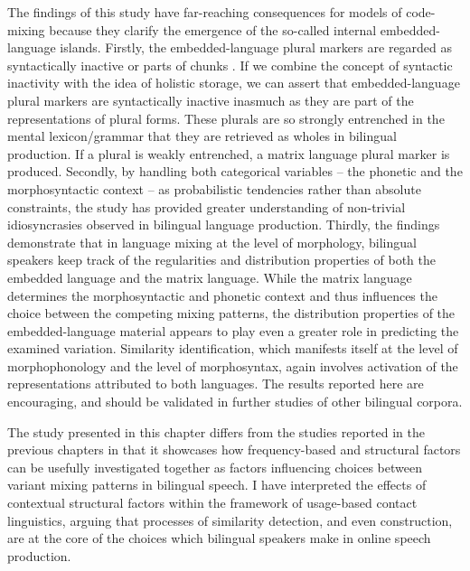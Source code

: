 The findings of this study have far-reaching consequences for models of code-mixing because they clarify the emergence of the so-called internal embedded-language islands. Firstly, the embedded-language plural markers are regarded as syntactically inactive \citep[92]{myers-scotton-contact-2002} or parts of chunks \citep[98]{backus-evidence-1999}. If we combine the concept of syntactic inactivity with the idea of holistic storage, we can assert that embedded-language plural markers are syntactically inactive inasmuch as they are part of the representations of plural forms. These plurals are so strongly entrenched in the mental lexicon/grammar that they are retrieved as wholes in bilingual production. If a plural is weakly entrenched, a matrix language plural marker is produced. Secondly, by handling both categorical variables -- the phonetic and the morphosyntactic context -- as probabilistic tendencies rather than absolute constraints, the study has provided greater understanding of non-trivial idiosyncrasies observed in bilingual language production. Thirdly, the findings demonstrate that in language mixing at the level of morphology, bilingual speakers keep track of the regularities and distribution properties of both the embedded language and the matrix language. While the matrix language determines the morphosyntactic and phonetic context and thus influences the choice between the competing mixing patterns, the distribution properties of the embedded-language material appears to play even a greater role in predicting the examined variation. Similarity identification, which manifests itself at the level of morphophonology and the level of morphosyntax, again involves activation of the representations attributed to both languages. The results reported here are encouraging, and should be validated in further studies of other bilingual corpora.

The study presented in this chapter differs from the studies reported in the previous chapters in that it showcases how frequency-based and structural factors can be usefully investigated together as factors influencing choices between variant mixing patterns in bilingual speech. I have interpreted the effects of contextual structural factors within the framework of usage-based contact linguistics, arguing that processes of similarity detection, and even construction, are at the core of the choices which bilingual speakers make in online speech production.